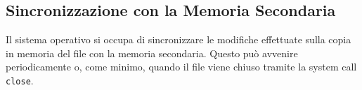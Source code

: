\subsection{Sincronizzazione con la Memoria Secondaria}
Il sistema operativo si occupa di sincronizzare le modifiche effettuate sulla copia in memoria del file con la memoria secondaria. Questo può avvenire periodicamente o, come minimo, quando il file viene chiuso tramite la system call \texttt{close}.

